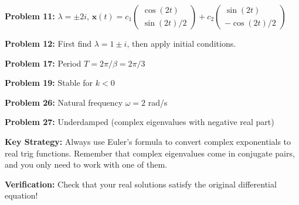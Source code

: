 \documentclass[12pt]{article}
\begin{document}
\textbf{Problem 11:} $\lambda = \pm 2i$, $\mathbf{x}(t) = c_{1}\begin{pmatrix} \cos(2t) \\ \sin(2t)/2 \end{pmatrix} + c_{2}\begin{pmatrix} \sin(2t) \\ -\cos(2t)/2 \end{pmatrix}$

\textbf{Problem 12:} First find $\lambda = 1 \pm i$, then apply initial conditions.

\textbf{Problem 17:} Period $T = 2\pi/\beta = 2\pi/3$

\textbf{Problem 19:} Stable for $k < 0$

\textbf{Problem 26:} Natural frequency $\omega = 2$ rad/s

\textbf{Problem 27:} Underdamped (complex eigenvalues with negative real part)

\textbf{Key Strategy:} Always use Euler's formula to convert complex exponentials to real trig functions. Remember that complex eigenvalues come in conjugate pairs, and you only need to work with one of them.

\textbf{Verification:} Check that your real solutions satisfy the original differential equation!
\end{document}

